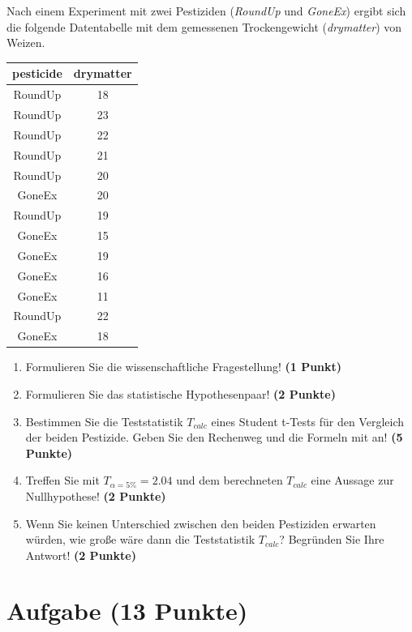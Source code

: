 \documentclass[a4paper, 10pt]{scrartcl}\usepackage[]{graphicx}\usepackage[]{xcolor}
\begin{document}
Nach einem Experiment mit zwei Pestiziden (\textit{RoundUp} und
\textit{GoneEx}) ergibt sich die folgende Datentabelle mit dem gemessenen
Trockengewicht (\textit{drymatter}) von Weizen.

\begin{table}[!h]
\centering
\begin{tabular}{cc}
\toprule
pesticide & drymatter\\
\midrule
RoundUp & 18\\
RoundUp & 23\\
RoundUp & 22\\
RoundUp & 21\\
RoundUp & 20\\
\addlinespace
GoneEx & 20\\
RoundUp & 19\\
GoneEx & 15\\
GoneEx & 19\\
GoneEx & 16\\
\addlinespace
GoneEx & 11\\
RoundUp & 22\\
GoneEx & 18\\
\bottomrule
\end{tabular}
\end{table}



\begin{enumerate}
  \item Formulieren Sie die wissenschaftliche Fragestellung! \textbf{(1 Punkt)}
  \item Formulieren Sie das statistische Hypothesenpaar! \textbf{(2
      Punkte)}
  \item Bestimmen Sie die Teststatistik $T_{calc}$ eines Student t-Tests f{\"u}r den
  Vergleich der beiden Pestizide. Geben Sie den Rechenweg und die Formeln
  mit an! \textbf{(5 Punkte)}
\item Treffen Sie mit $T_{\alpha = 5\%} = 2.04$ und dem berechneten $T_{calc}$ eine Aussage
  zur Nullhypothese! \textbf{(2 Punkte)}
\item Wenn Sie keinen Unterschied zwischen den beiden Pestiziden erwarten
  w{\"u}rden, wie gro{\ss}e w{\"a}re dann die Teststatistik $T_{calc}$? Begr{\"u}nden Sie Ihre
  Antwort! \textbf{(2 Punkte)}
\end{enumerate} 
\clearpage

\section{Aufgabe \hfill (13 Punkte)}
\end{document}
